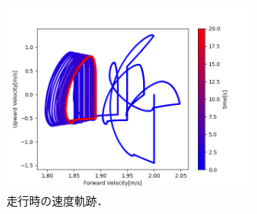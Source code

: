 \begin{figure}
\begin{minipage}[b]{.5\linewidth}
 \end{minipage}
 \begin{minipage}[b]{.5\linewidth}
  \centering
  \includegraphics[clip,width = 8cm]{./fig/Velocity_dx2run.png}
 \end{minipage}
 \caption{走行時の速度軌跡．\label{rtrj}}
\end{figure}
